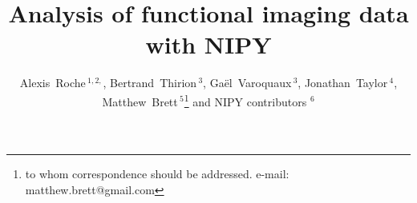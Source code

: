 \documentclass{bioinfo}
\begin{document}

\title[nipy-paper]{Analysis of functional imaging data with NIPY}

\author[Roche,Thirion,Varoquaux,Taylor,Brett]
{Alexis~Roche\,$^{1,2,}$, Bertrand~Thirion\,$^{3}$, Ga\"el~Varoquaux\,$^{3}$,
Jonathan~Taylor\,$^{4}$, Matthew~Brett\,$^{5}$\footnote{to whom correspondence
should be addressed. e-mail: matthew.brett@gmail.com} and NIPY
contributors $^{6}$}

\address{\,$^{1}$University Hospital, Lausanne, Switzerland\\
  \,$^{2}$Siemens Healthcare Sector, Lausanne, Switzerland\\ 
  \,$^{3}$INRIA, Parietal team, Neurospin, Saclay, France\\
  \,$^{4}$Stanford University, Stanford, CA, USA\\
  \,$^{5}$University of California, Berkeley, CA, USA\\
  \,$^{6}$\texttt{https://github.com/nipy/nipy/contributors}
}

\history{}

\editor{}

\maketitle
\end{document}
